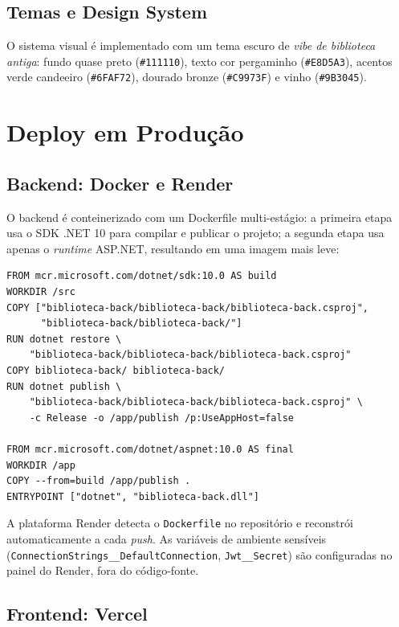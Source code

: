 \documentclass[
  12pt,
  a4paper,
  oneside,
  brazil
]{abntex2}
\begin{document}
\subsection{Temas e Design System}

O sistema visual é implementado com um tema escuro de \textit{vibe de biblioteca antiga}: fundo quase preto (\texttt{\#111110}), texto cor pergaminho (\texttt{\#E8D5A3}), acentos verde candeeiro (\texttt{\#6FAF72}), dourado bronze (\texttt{\#C9973F}) e vinho (\texttt{\#9B3045}).

\section{Deploy em Produção}

\subsection{Backend: Docker e Render}

O backend é conteinerizado com um Dockerfile multi-estágio: a primeira etapa usa o SDK .NET 10 para compilar e publicar o projeto; a segunda etapa usa apenas o \textit{runtime} ASP.NET, resultando em uma imagem mais leve:

\begin{lstlisting}[style=docker, caption={Dockerfile multi-estágio para o backend}, label=lst:docker]
FROM mcr.microsoft.com/dotnet/sdk:10.0 AS build
WORKDIR /src
COPY ["biblioteca-back/biblioteca-back/biblioteca-back.csproj",
      "biblioteca-back/biblioteca-back/"]
RUN dotnet restore \
    "biblioteca-back/biblioteca-back/biblioteca-back.csproj"
COPY biblioteca-back/ biblioteca-back/
RUN dotnet publish \
    "biblioteca-back/biblioteca-back/biblioteca-back.csproj" \
    -c Release -o /app/publish /p:UseAppHost=false

FROM mcr.microsoft.com/dotnet/aspnet:10.0 AS final
WORKDIR /app
COPY --from=build /app/publish .
ENTRYPOINT ["dotnet", "biblioteca-back.dll"]
\end{lstlisting}

A plataforma Render detecta o \texttt{Dockerfile} no repositório e reconstrói automaticamente a cada \textit{push}. As variáveis de ambiente sensíveis (\texttt{ConnectionStrings\_\_DefaultConnection}, \texttt{Jwt\_\_Secret}) são configuradas no painel do Render, fora do código-fonte.

\subsection{Frontend: Vercel}
\end{document}
